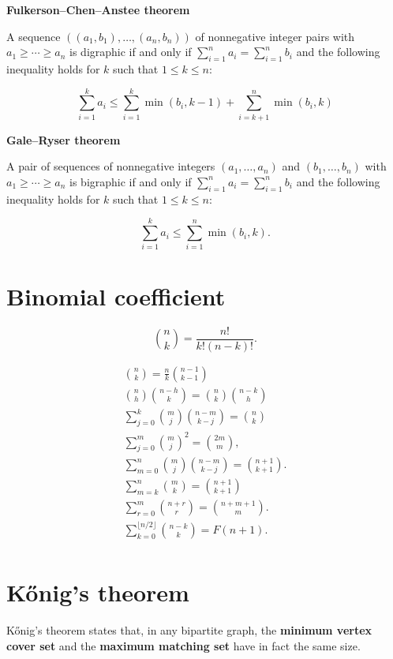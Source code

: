 \documentclass[11pt]{article}
\begin{document}
\begin{multicols}{3}
\textbf{Fulkerson–Chen–Anstee theorem}

A sequence $((a_{1},b_{1}),\ldots ,(a_{n},b_{n}))$ of nonnegative integer pairs with $ a_{1}\geq \cdots \geq a_{n}$ is digraphic if and only if $\sum _{i=1}^{n}a_{i}=\sum _{i=1}^{n}b_{i}$ and the following inequality holds for $k$ such that $ 1\leq k\leq n$:

$$\sum _{i=1}^{k}a_{i}\leq \sum _{i=1}^{k}\min(b_{i},k-1)+\sum _{i=k+1}^{n}\min(b_{i},k)$$

\textbf{Gale–Ryser theorem}

A pair of sequences of nonnegative integers $(a_{1},\ldots ,a_{n})$ and $(b_{1},\ldots ,b_{n})$ with $a_{1}\geq \cdots \geq a_{n}$ is bigraphic if and only if $ \sum _{i=1}^{n}a_{i}=\sum _{i=1}^{n}b_{i}$ and the following inequality holds for $k$ such that $ 1\leq k\leq n$:

$$ \sum _{i=1}^{k}a_{i}\leq \sum _{i=1}^{n}\min(b_{i},k).$$

\section{Binomial coefficient}

$${\binom {n}{k}}={\frac {n!}{k!(n-k)!}}. $$

\begin{gather*}
{\binom {n}{k}}={\frac {n}{k}}{\binom {n-1}{k-1}}\\	
{\binom {n}{h}}{\binom {n-h}{k}}={\binom {n}{k}}{\binom {n-k}{h}}\\
\sum _{j=0}^{k}{\binom {m}{j}}{\binom {n-m}{k-j}}={\binom {n}{k}}\\
\sum _{j=0}^{m}{\binom {m}{j}}^{2}={\binom {2m}{m}},\\
\sum _{m=0}^{n}{\binom {m}{j}}{\binom {n-m}{k-j}}={\binom {n+1}{k+1}}.\\
\sum _{m=k}^{n}{\binom {m}{k}}={\binom {n+1}{k+1}}\\
\sum _{r=0}^{m}{\binom {n+r}{r}}={\binom {n+m+1}{m}}.\\
\sum _{k=0}^{\lfloor n/2\rfloor }{\binom {n-k}{k}}=F(n+1).\\
\end{gather*}

\section{Kőnig's theorem}
Kőnig's theorem states that, in any bipartite graph, the \textbf{minimum vertex cover set} and the \textbf{maximum matching set} have in fact the same size.


\end{multicols}
\end{document}
